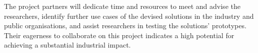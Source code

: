 The project partners will dedicate time and resources to meet and advise the researchers, identify further use cases of the devised solutions in the industry and public organisations, and assist researchers in testing the solutions' prototypes. Their eagerness to collaborate on this project indicates a high potential for achieving a substantial industrial impact.












